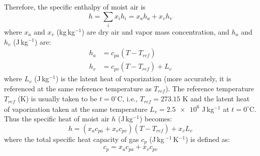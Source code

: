 Therefore, the specific enthalpy of moist air is 
\begin{equation}
h = \sum_i x_i h_i = x_a h_a + x_v h_v
\end{equation}
where $x_a$ and $x_v$ (kg\,kg$^{-1}$) are dry air and vapor mass concentration, and $h_a$ and $h_v$ (J\,kg$^{-1}$) are:
\begin{align}
h_a &= c_{pa} \left(T - T_{\textit{ref}}\right) \\
h_v &= c_{pv} \left(  T - T_{\textit{ref}}\right) + L_v
\end{align}
where $L_v$ (J\,kg$^{-1}$) is the latent heat of vaporization (more accurately, it is referenced at the same reference temperature as $T_{\textit{ref}}$). The reference temperature $T_{\textit{ref}}$ (K) is usually taken to be $t=0^{\circ}$C, i.e., $T_{\textit{ref}} = 273.15$ K and the latent heat of vaporization taken at the same temperature $L_v = \num{2.5e6}$ J\,kg$^{-1}$ at $t=0^{\circ}$C. Thus the specific heat of moist air $h$ (J\,kg$^{-1}$) becomes:
\begin{equation}
h = \left(x_a c_{pa} + x_v c_{pv} \right) \left(T - T_{\textit{ref}}\right)  + x_v L_v
\label{eq:enthalpymoistair}
\end{equation}
where the total specific heat capacity of gas $c_p$ (J\,kg\,$^{-1}$\,K$^{-1}$) is defined as:
\begin{equation}
c_p = x_a c_{pa} + x_v c_{pv}
\end{equation}

%

